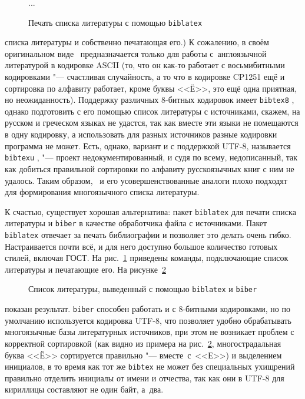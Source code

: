 \documentclass[a4paper,12pt,hyphens]{article}
\newcommand\package[1]{\texttt{#1}}
\newcommand\exe[1]{\texttt{#1}}
\begin{document}
\begin{figure}[tp]
\begin{latexcode}
\usepackage[style=gost-numeric]{biblatex}


...

\printbibliography
\end{latexcode}
\caption{Печать списка литературы с помощью \package{biblatex}}\label{biblatex1}
\end{figure}
списка литературы и собственно печатающая его.)
К сожалению, в своём оригинальном виде \BibTeX\ предназначается только
для работы с~англоязычной литературой в кодировке ASCII (то, что
он как-то работает с восьмибитными кодировками "--- счастливая случайность,
а то что в кодировке CP1251 ещё и сортировка по алфавиту работает,
кроме буквы <<Ё>>, это ещё одна приятная, но неожиданность). Поддержку различных
8-битных кодировок имеет \exe{bibtex8} \parencite{ctan-bibtex8},
однако подготовить с его помощью
список литературы с источниками, скажем, на русском и греческом языках
не удастся, так как вместе эти языки не помещаются в одну кодировку, а
использовать для разных источников разные кодировки программа не может.
Есть, однако, вариант и с поддержкой UTF-8, называется
\exe{bibtexu} \parencite{ctan-bibtexu,se-bibtexu}, "--- проект
недокументированный, и судя по всему, недописанный, так как
добиться правильной сортировки по алфавиту русскоязычных книг с ним
не удалось. Таким образом, \BibTeX\ и его усовершенствованные аналоги
плохо подходят для формирования многоязычного списка литературы.

К счастью, существует хорошая альтернатива: пакет
\package{biblatex} \parencite{ctan-biblatex,se-biblatex}
для печати списка литературы и
\exe{biber} \parencite{ctan-biber}
в качестве обработчика файла с источниками.
Пакет \package{biblatex} отвечает за печать библиографии и позволяет
это делать очень гибко. Настраивается почти всё, и для него доступно большое
количество готовых стилей, включая ГОСТ. На рис.~\ref{biblatex1}
приведены
команды, подключающие список литературы и печатающие его. На рисунке~\ref{biblatex2}%
\nocite{esin1950,yolkin1997,chebyshev1859,eliseeva2010}%
%
%
\begin{figure}[tp]
\begin{tcolorbox}[colback=white,colframe=white]
\printbibliography[keyword=example,resetnumbers=1]
\end{tcolorbox}
\caption{Список литературы, выведенный с помощью \package{biblatex} и \exe{biber}}\label{biblatex2}
\end{figure}
показан результат.
\exe{biber} способен работать и с 8-битными кодировками, но по умолчанию
используется кодировка UTF-8, что позволяет удобно обрабатывать многоязычные
базы литературных источников, при этом не возникает проблем с корректной сортировкой
(как видно из примера на рис.~\ref{biblatex2}, многострадальная буква <<Ё>>
сортируется правильно "--- вместе~с~<<Е>>) и выделением инициалов, в то время как
тот же \exe{bibtex} не может без специальных ухищрений правильно отделить
инициалы от имени и отчества, так как они в UTF-8 для кириллицы составляют не
один байт, а~два.
\end{document}
